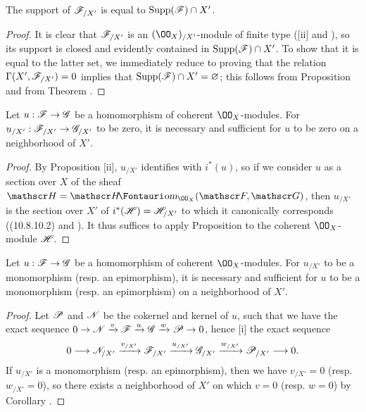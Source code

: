 \begin{cor}[10.8.12]
\label{1.10.8.12}
The support of $\mathscr{F}_{/X'}$ is equal to $\operatorname{Supp}(\mathscr{F})\cap X'$.
\end{cor}

\begin{proof}
\label{proof-1.10.8.12}
It is clear that $\mathscr{F}_{/X'}$ is an $(\OO_X)_{/X'}$-module of finite type ([ii] and ),
so its support is closed  and evidently contained in $\operatorname{Supp}(\mathscr{F})\cap X'$.
To show that it is equal to the latter set, we immediately reduce to proving that the relation $\Gamma(X',\mathscr{F}_{/X'})=0$ implies that $\operatorname{Supp}(\mathscr{F})\cap X'=\varnothing$; this follows from Proposition  and from Theorem .
\end{proof}

\begin{cor}[10.8.13]
\label{1.10.8.13}
Let $u:\sh{F}\to\sh{G}$ be a homomorphism of coherent $\OO_X$-modules.
For $u_{/X'}:\sh{F}_{/X'}\to\sh{G}_{/X'}$ to be zero, it is necessary and sufficient for $u$ to be zero on a neighborhood of $X'$.
\end{cor}

\begin{proof}
\label{proof-1.10.8.13}
By Proposition [ii], $u_{/X'}$ identifies with $i^*(u)$, so if we consider $u$ as a section over $X$ of the sheaf $\sh{H}=\shHom_{\OO_X}(\sh{F},\sh{G})$, then $u_{/X'}$ is the section over $X'$ of $i^*(\mathscr{H})=\mathscr{H}_{/X'}$ to which it canonically corresponds ((10.8.10.2) and ).
It thus suffices to apply Proposition  to the coherent $\OO_X$-module $\mathscr{H}$.
\end{proof}

\begin{cor}[10.8.14]
\label{1.10.8.14}
Let $u:\sh{F}\to\sh{G}$ be a homomorphism of coherent $\OO_X$-modules.
For $u_{/X'}$ to be a monomorphism (resp. an epimorphism), it is necessary and sufficient for $u$ to be a monomorphism (resp. an epimorphism) on a neighborhood of $X'$.
\end{cor}

\begin{proof}
\label{proof-1.10.8.14}
Let $\mathscr{P}$ and $\mathscr{N}$ be the cokernel and kernel of $u$, such that we have the exact sequence $0\to\sh{N}\xrightarrow{v}\sh{F}\xrightarrow{u}\sh{G}\xrightarrow{w}\sh{P}\to 0$, hence [i] the exact sequence
\[
  0\to\sh{N}_{/X'}\xrightarrow{v_{/X'}}\sh{F}_{/X'}\xrightarrow{u_{/X'}}\sh{G}_{/X'}\xrightarrow{w_{/X'}}\sh{P}_{/X'}\to 0.
\]
If $u_{/X'}$ is a monomorphism (resp. an epimorphism), then we have $v_{/X'}=0$ (resp. $w_{/X'}=0$), so there exists a neighborhood of $X'$ on which $v=0$ (resp. $w=0$) by Corollary .
\end{proof}

